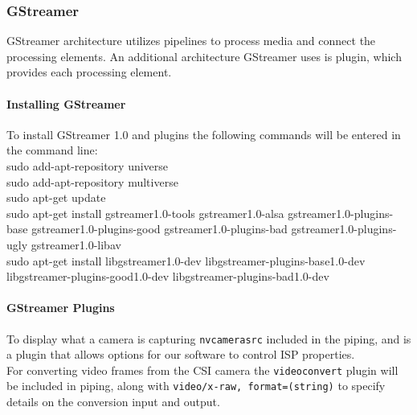 \documentclass[letterpaper,10pt,serif,draftclsnofoot,onecolumn,compsoc,titlepage]{IEEEtran}
\begin{document}
\subsubsection{GStreamer}

GStreamer architecture utilizes pipelines to process media and connect the processing 
elements. An additional architecture GStreamer uses is plugin, which provides each 
processing element. \\

\paragraph{Installing GStreamer}

To install GStreamer 1.0 and plugins the following commands will be entered in the 
command line: \\

sudo add-apt-repository universe \\
sudo add-apt-repository multiverse \\
sudo apt-get update \\
sudo apt-get install gstreamer1.0-tools gstreamer1.0-alsa gstreamer1.0-plugins-base 
gstreamer1.0-plugins-good gstreamer1.0-plugins-bad gstreamer1.0-plugins-ugly 
gstreamer1.0-libav \\
sudo apt-get install libgstreamer1.0-dev libgstreamer-plugins-base1.0-dev 
libgstreamer-plugins-good1.0-dev libgstreamer-plugins-bad1.0-dev \\

\paragraph{GStreamer Plugins}

To display what a camera is capturing \texttt{nvcamerasrc} included in the piping, 
and is a plugin that allows options for our software to control ISP properties. \\

For converting video frames from the CSI camera the \texttt{videoconvert} plugin will 
be included in piping, along with \texttt{video/x-raw, format=(string){}} to specify 
details on the conversion input and output. \\


\nocite{*}
%
%
\end{document}
